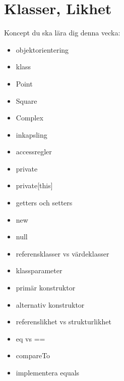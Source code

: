 \chapter{Klasser, Likhet}\label{chapter:W06}
Koncept du ska lära dig denna vecka:
\begin{multicols}{2}\begin{itemize}[nosep,label={$\square$},leftmargin=*]
\item objektorientering
\item klass
\item Point
\item Square
\item Complex
\item inkapsling
\item accessregler
\item private
\item private[this]
\item getters och setters
\item new
\item null
\item referensklasser vs värdeklasser
\item klassparameter
\item primär konstruktor
\item alternativ konstruktor
\item referenslikhet vs strukturlikhet
\item eq vs ==
\item compareTo
\item implementera equals\end{itemize}\end{multicols}
